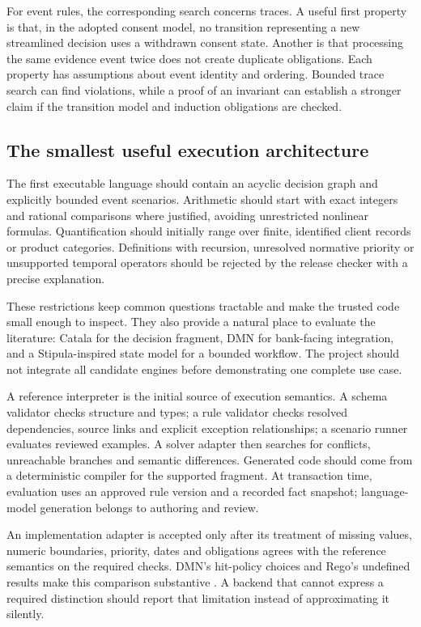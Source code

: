 For event rules, the corresponding search concerns traces. A useful first
property is that, in the adopted consent model, no transition representing a new
streamlined decision uses a withdrawn consent state. Another is that processing
the same evidence event twice does not create duplicate obligations. Each
property has assumptions about event identity and ordering. Bounded trace search
can find violations, while a proof of an invariant can establish a stronger
claim if the transition model and induction obligations are checked.

\subsection{The smallest useful execution architecture}

The first executable language should contain an acyclic decision graph and
explicitly bounded event scenarios. Arithmetic should start with exact integers
and rational comparisons where justified, avoiding unrestricted nonlinear
formulas. Quantification should initially range over finite, identified client
records or product categories. Definitions with recursion, unresolved normative
priority or unsupported temporal operators should be rejected by the release
checker with a precise explanation.

These restrictions keep common questions tractable and make the trusted code
small enough to inspect. They also provide a natural place to evaluate the
literature: Catala for the decision fragment, DMN for bank-facing integration,
and a Stipula-inspired state model for a bounded workflow. The project should not
integrate all candidate engines before demonstrating one complete use case.

A reference interpreter is the initial source of execution semantics. A schema
validator checks structure and types; a rule validator checks resolved dependencies,
source links and explicit exception relationships; a scenario runner evaluates
reviewed examples. A solver adapter then searches for conflicts, unreachable
branches and semantic differences. Generated code should come from a deterministic
compiler for the supported fragment. At transaction time, evaluation uses an
approved rule version and a recorded fact snapshot; language-model generation
belongs to authoring and review.

An implementation adapter is accepted only after its treatment of missing
values, numeric boundaries, priority, dates and obligations agrees with the
reference semantics on the required checks. DMN's hit-policy choices and Rego's
undefined results make this comparison substantive
\citep{dmn2024,opadocs}. A backend that cannot express a required distinction
should report that limitation instead of approximating it silently.

